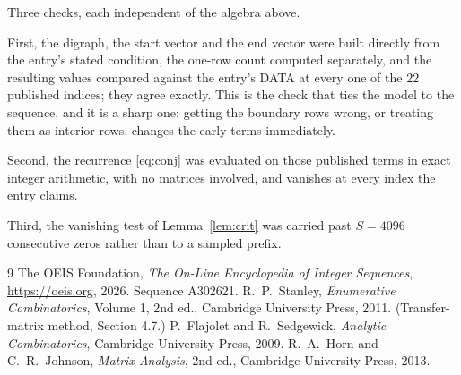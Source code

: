 \documentclass[11pt,a4paper]{article}
\theoremstyle{plain}
\theoremstyle{definition}
\begin{document}
Three checks, each independent of the algebra above.

First, the digraph, the start vector and the end vector were built directly from the
entry's stated condition, the one-row count computed separately, and the resulting values
compared against the entry's DATA at every one of the $22$ published indices; they
agree exactly. This is the check that ties the model to the sequence, and it is a sharp one:
getting the boundary rows wrong, or treating them as interior rows, changes the early terms
immediately.

Second, the recurrence \eqref{eq:conj} was evaluated on those published terms in exact
integer arithmetic, with no matrices involved, and vanishes at every index the entry claims.

Third, the vanishing test of Lemma~\ref{lem:crit} was carried past $S=4096$ consecutive
zeros rather than to a sampled prefix.

\begin{thebibliography}{9}
 The OEIS Foundation, \emph{The On-Line Encyclopedia of Integer
Sequences}, \url{https://oeis.org}, 2026. Sequence A302621.
 R.~P.~Stanley, \emph{Enumerative Combinatorics}, Volume 1, 2nd ed.,
Cambridge University Press, 2011. (Transfer-matrix method, Section 4.7.)
 P.~Flajolet and R.~Sedgewick, \emph{Analytic Combinatorics}, Cambridge
University Press, 2009.
 R.~A.~Horn and C.~R.~Johnson, \emph{Matrix Analysis}, 2nd ed., Cambridge
University Press, 2013.
\end{thebibliography}
\end{document}
